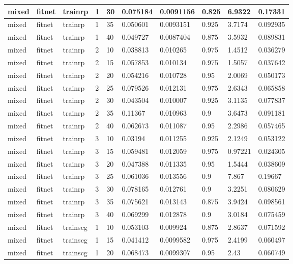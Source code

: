 \begin{longtable}{lllllllll}
mixed & fitnet & trainrp & 1 & 30 & 0.075184 & 0.0091156 & 0.825 & 6.9322 & 0.17331 \\ \hline 
mixed & fitnet & trainrp & 1 & 35 & 0.050601 & 0.0093151 & 0.925 & 3.7174 & 0.092935 \\ \hline 
mixed & fitnet & trainrp & 1 & 40 & 0.049727 & 0.0087404 & 0.875 & 3.5932 & 0.089831 \\ \hline 
mixed & fitnet & trainrp & 2 & 10 & 0.038813 & 0.010265 & 0.975 & 1.4512 & 0.036279 \\ \hline 
mixed & fitnet & trainrp & 2 & 15 & 0.057853 & 0.010134 & 0.975 & 1.5057 & 0.037642 \\ \hline 
mixed & fitnet & trainrp & 2 & 20 & 0.054216 & 0.010728 & 0.95 & 2.0069 & 0.050173 \\ \hline 
mixed & fitnet & trainrp & 2 & 25 & 0.079526 & 0.012131 & 0.975 & 2.6343 & 0.065858 \\ \hline 
mixed & fitnet & trainrp & 2 & 30 & 0.043504 & 0.010007 & 0.925 & 3.1135 & 0.077837 \\ \hline 
mixed & fitnet & trainrp & 2 & 35 & 0.11367 & 0.010963 & 0.9 & 3.6473 & 0.091181 \\ \hline 
mixed & fitnet & trainrp & 2 & 40 & 0.062673 & 0.011087 & 0.95 & 2.2986 & 0.057465 \\ \hline 
mixed & fitnet & trainrp & 3 & 10 & 0.03194 & 0.011255 & 0.925 & 2.1249 & 0.053122 \\ \hline 
mixed & fitnet & trainrp & 3 & 15 & 0.059481 & 0.012059 & 0.975 & 0.97221 & 0.024305 \\ \hline 
mixed & fitnet & trainrp & 3 & 20 & 0.047388 & 0.011335 & 0.95 & 1.5444 & 0.038609 \\ \hline 
mixed & fitnet & trainrp & 3 & 25 & 0.061036 & 0.013556 & 0.9 & 7.867 & 0.19667 \\ \hline 
mixed & fitnet & trainrp & 3 & 30 & 0.078165 & 0.012761 & 0.9 & 3.2251 & 0.080629 \\ \hline 
mixed & fitnet & trainrp & 3 & 35 & 0.075621 & 0.013143 & 0.875 & 3.9424 & 0.098561 \\ \hline 
mixed & fitnet & trainrp & 3 & 40 & 0.069299 & 0.012878 & 0.9 & 3.0184 & 0.075459 \\ \hline 
mixed & fitnet & trainscg & 1 & 10 & 0.053103 & 0.009924 & 0.875 & 2.8637 & 0.071592 \\ \hline 
mixed & fitnet & trainscg & 1 & 15 & 0.041412 & 0.0099582 & 0.975 & 2.4199 & 0.060497 \\ \hline 
mixed & fitnet & trainscg & 1 & 20 & 0.068473 & 0.0099307 & 0.95 & 2.43 & 0.060749 \\ \hline 

\end{longtable}
